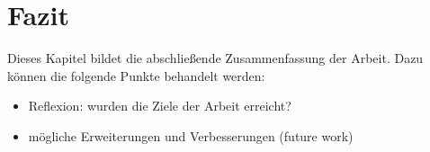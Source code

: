 \chapter{Fazit}
\label{ch:fazit}

Dieses Kapitel bildet die abschließende Zusammenfassung der Arbeit. Dazu können die folgende Punkte behandelt werden:
\begin{itemize}
	\item Reflexion: wurden die Ziele der Arbeit erreicht?
	\item mögliche Erweiterungen und Verbesserungen (\glqq future work\grqq)
\end{itemize}